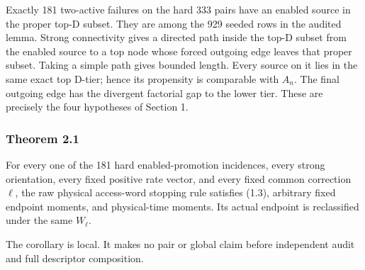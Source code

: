 Exactly 181 two-active failures on the hard 333 pairs have an enabled
source in the proper top-D subset. They are among the 929 seeded rows in
the audited lemma. Strong connectivity gives a directed path inside the
top-D subset from the enabled source to a top node whose forced outgoing
edge leaves that proper subset. Taking a simple path gives bounded
length. Every source on it lies in the same exact top D-tier; hence its
propensity is comparable with \(A_n\). The final outgoing edge has the
divergent factorial gap to the lower tier. These are precisely the four
hypotheses of Section 1.

\subsubsection{Theorem 2.1}

For every one of the 181 hard enabled-promotion incidences, every strong
orientation, every fixed positive rate vector, and every fixed common
correction \(\ell\), the raw physical access-word stopping rule
satisfies (1.3), arbitrary fixed endpoint moments, and physical-time
moments. Its actual endpoint is reclassified under the same \(W_\ell\).

The corollary is local. It makes no pair or global claim before
independent audit and full descriptor composition.
